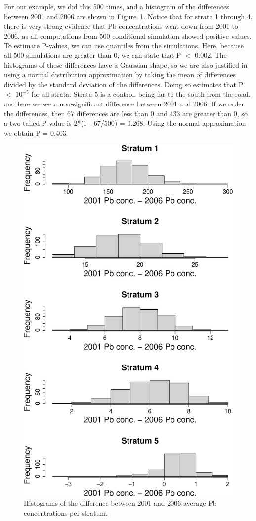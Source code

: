 \documentclass[12pt, titlepage]{article}
\begin{document}
For our example, we did this 500 times, and a histogram of the differences between 2001 and 2006 are shown in Figure~\ref{Fig:MossDiffHist}.  Notice that for strata 1 through 4, there is very strong evidence that Pb concentrations went down from 2001 to 2006, as all computations from 500 conditional simulation showed positive values.  To estimate P-values, we can use quantiles from the simulations.  Here, because all 500 simulations are greater than 0, we can state that P $<$ 0.002. The histograms of these differences have a Gaussian shape, so we are also justified in using a normal distribution approximation by taking the mean of differences divided by the standard deviation of the differences.  Doing so estimates that P $<$ $10^{-5}$ for all strata.  Strata 5 is a control, being far to the south from the road, and here we see a non-significant difference between 2001 and 2006.  If we order the differences, then 67 differences are less than 0 and 433 are greater than 0, so a two-tailed P-value is 2*(1 - 67/500) = 0.268.  Using the normal approximation we obtain P = 0.403.

\begin{figure}[H]
  \begin{center}
	    \includegraphics[width=0.5\linewidth]{figures/Moss_diffhist}
  \end{center}
  \caption{Histograms of the difference between 2001 and 2006 average Pb concentrations per stratum. \label{Fig:MossDiffHist}}
\end{figure}
\end{document}
